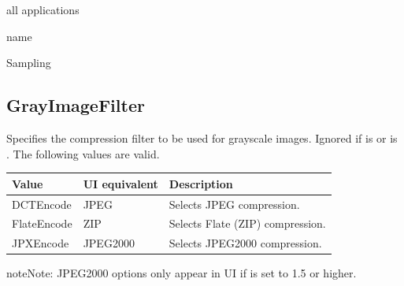 \documentclass[letterpaper,12pt,english,openany,oneside]{sphinxmanual}
\begin{document}
all applications

\label{\detokenize{PDF_Create_CommonSettings:type-46}}

name

\label{\detokenize{PDF_Create_CommonSettings:ui-name-34}}

Sampling

\label{\detokenize{PDF_Create_CommonSettings:default-value-42}}

\begin{sphinxVerbatim}[commandchars=\\\{\}]
\end{sphinxVerbatim}




\subsection{GrayImageFilter}
\label{\detokenize{PDF_Create_CommonSettings:grayimagefilter}}
Specifies the compression filter to be used for grayscale images. Ignored if  is  or  is  . The following values are valid.


\begin{savenotes}\sphinxattablestart
\centering
{}\label{\detokenize{PDF_Create_CommonSettings:section-9}}\nobreak
\begin{tabulary}{\linewidth}[t]{|T|T|T|}
\hline
\sphinxstyletheadfamily 
Value
&\sphinxstyletheadfamily 
UI equivalent
&\sphinxstyletheadfamily 
Description
\\
\hline
DCTEncode
&
JPEG
&
Selects JPEG compression.
\\
\hline
FlateEncode
&
ZIP
&
Selects Flate (ZIP) compression.
\\
\hline
JPXEncode
&
JPEG2000
&
Selects JPEG2000 compression.
\\
\hline
\end{tabulary}
\par
\sphinxattableend\end{savenotes}

\begin{sphinxadmonition}{note}{Note:}
JPEG2000 options only appear in UI if  is set to 1.5 or higher.
\end{sphinxadmonition}
\end{document}
